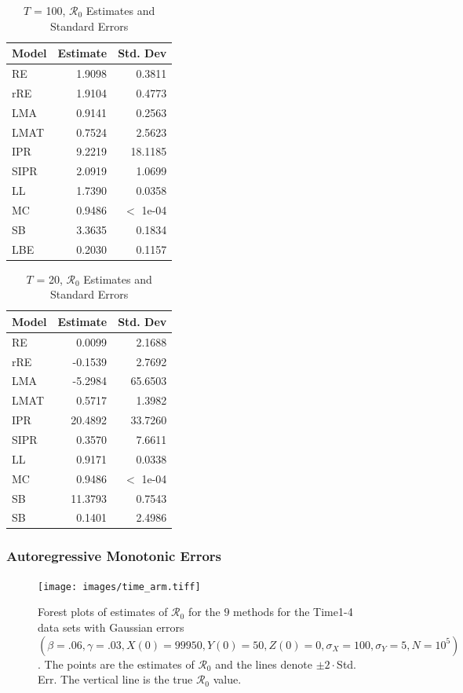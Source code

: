 \documentclass[12pt]{article}
\newcommand{\xxsir}{\ensuremath{9} } %
\newcommand{\rr}{\ensuremath{\mathcal{R}_0}}
\begin{document}
\begin{table}[H]
	
	
	\centering
	\begin{tabular}[t]{l|r|r}
		\hline
		Model & Estimate & Std. Dev\\
		\hline
		RE & 1.9098 & 0.3811\\
		\hline
		rRE & 1.9104 & 0.4773\\
		\hline
		LMA & 0.9141 & 0.2563\\
		\hline
		LMAT & 0.7524 & 2.5623\\
		\hline
		IPR & 9.2219 & 18.1185\\
		\hline
		SIPR & 2.0919 & 1.0699\\
		\hline
		LL & 1.7390 & 0.0358\\
		\hline
		MC & 0.9486 & $<$ 1e-04\\
		\hline
		SB & 3.3635 & 0.1834\\
		\hline
		LBE & 0.2030 & 0.1157\\
		\hline
	\end{tabular}
	\caption{ $T$ = 100, $\rr$ Estimates and Standard Errors}
\end{table}

\begin{table}[H]
	\centering
	\begin{tabular}[t]{l|r|r}
		\hline
		Model & Estimate & Std. Dev\\
		\hline
		RE & 0.0099 & 2.1688\\
		\hline
		rRE & -0.1539 & 2.7692\\
		\hline
		LMA & -5.2984 & 65.6503\\
		\hline
		LMAT & 0.5717 & 1.3982\\
		\hline
		IPR & 20.4892 & 33.7260\\
		\hline
		SIPR & 0.3570 & 7.6611\\
		\hline
		LL & 0.9171 & 0.0338\\
		\hline
		MC & 0.9486 & $<$ 1e-04\\
		\hline
		SB & 11.3793 & 0.7543\\
		\hline
		SB & 0.1401 & 2.4986\\
		\hline
	\end{tabular}
	\caption{$T$ = 20, $\rr$ Estimates and Standard Errors}
\end{table}

\subsubsection{Autoregressive Monotonic Errors}
\begin{figure}[H]
	\centering
	\texttt{[image: images/time\_arm.tiff]}
	\caption{Forest plots of estimates of $\rr$ for the \xxsir methods for the Time1-4 data sets with Gaussian errors $(\beta=.06, \gamma=.03, X(0)=99950, Y(0)=50, Z(0)=0, \sigma_X=100, \sigma_Y=5, N=10^5)$.  The points are the estimates of $\rr$ and the lines denote $\pm 2\cdot $Std. Err.  The vertical line is the true $\rr$ value.}
\end{figure}
\end{document}
